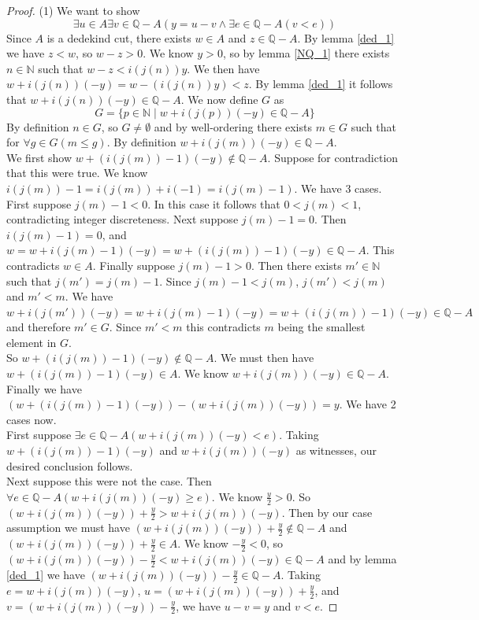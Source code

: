 \documentclass{report}
\begin{document}
\begin{proof}(1)
We want to show 
\begin{equation*}
\exists u\in A\exists v\in\mathbb Q-A(y=u-v\land\exists e\in\mathbb Q-A(v<e))
\end{equation*}
Since $A$ is a dedekind cut, there exists $w\in A$ and $z\in\mathbb Q-A$.
By lemma \ref{ded_1} we have $z<w$, so $w-z>0$.
We know $y>0$, so by lemma \ref{NQ_1} there exists $n\in\mathbb N$ such that $w-z<i(j(n))y$. We then have $w+i(j(n))(-y)=w-(i(j(n))y)<z$. By lemma \ref{ded_1} it follows that
$w+i(j(n))(-y)\in\mathbb Q-A$. We now define $G$ as
\begin{equation*}
G=\{p\in\mathbb N\mid w+i(j(p))(-y)\in\mathbb Q-A\}
\end{equation*}
By definition $n\in G$, so $G\neq\emptyset$ and by well-ordering there exists $m\in G$ such that for $\forall g\in G(m\leq g)$.
By definition $w+i(j(m))(-y)\in\mathbb Q-A$.\\
\indent We first show $w+(i(j(m))-1)(-y)\notin\mathbb Q-A$. Suppose for contradiction that this were true. We know $i(j(m))-1=i(j(m))+i(-1)=i(j(m)-1)$. We have 3 cases. First suppose $j(m)-1<0$.
In this case it follows that $0<j(m)<1$, contradicting integer discreteness. Next suppose $j(m)-1=0$. Then $i(j(m)-1)=0$, and
$w=w+i(j(m)-1)(-y)=w+(i(j(m))-1)(-y)\in\mathbb Q-A$. This contradicts $w\in A$. Finally suppose $j(m)-1>0$. Then there exists $m'\in\mathbb N$ such that $j(m')=j(m)-1$. Since $j(m)-1<j(m)$, 
$j(m')<j(m)$ and $m'<m$. We have $w+i(j(m'))(-y)=w+i(j(m)-1)(-y)=w+(i(j(m))-1)(-y)\in\mathbb Q-A$
and therefore $m'\in G$. Since $m'<m$ this contradicts $m$ being the smallest element in $G$.\\
\indent So $w+(i(j(m))-1)(-y)\notin\mathbb Q-A$. We must then have $w+(i(j(m))-1)(-y)\in A$. We know
$w+i(j(m))(-y)\in\mathbb Q-A$. Finally we have $(w+(i(j(m))-1)(-y))-(w+i(j(m))(-y))=y$. We have 2 cases now.\\
\indent First suppose $\exists e\in\mathbb Q-A(w+i(j(m))(-y)<e)$. Taking $w+(i(j(m))-1)(-y)$ and $w+i(j(m))(-y)$ as witnesses, our desired conclusion follows.\\
\indent Next suppose this were not the case. Then $\forall e\in\mathbb Q-A(w+i(j(m))(-y)\geq e)$.
We know $\frac y2>0$. So $(w+i(j(m))(-y))+\frac y2>w+i(j(m))(-y)$. Then by our case assumption we must have $(w+i(j(m))(-y))+\frac y2\notin\mathbb Q-A$ and $(w+i(j(m))(-y))+\frac y2\in A$. 
We know $-\frac y2<0$, so $(w+i(j(m))(-y))-\frac y2<w+i(j(m))(-y)\in\mathbb Q-A$ and by lemma \ref{ded_1} we have
$(w+i(j(m))(-y))-\frac y2\in\mathbb Q-A$. Taking $e=w+i(j(m))(-y)$, $u=(w+i(j(m))(-y))+\frac y2$, and $v=(w+i(j(m))(-y))-\frac y2$, we have $u-v=y$ and $v<e$.
\end{proof}
\end{document}
